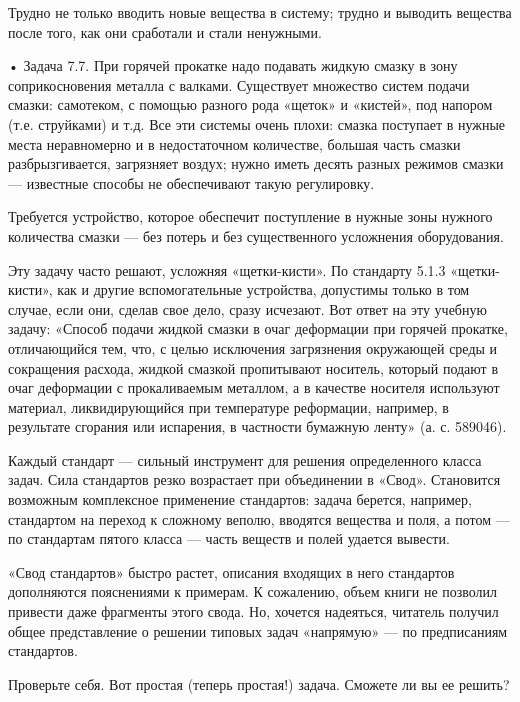 Трудно не только  вводить новые вещества в систему;  трудно и выводить
вещества после того, как они сработали и стали ненужными.

• Задача 7.7. При горячей прокатке  надо подавать жидкую смазку в зону
соприкосновения металла с валками.  Существует множество систем подачи
смазки:  самотеком, с  помощью разного  рода «щеток»  и «кистей»,  под
напором (т.е.  струйками) и т.д.  Все эти системы очень  плохи: смазка
поступает в  нужные места  неравномерно и в  недостаточном количестве,
большая часть  смазки разбрызгивается, загрязняет воздух;  нужно иметь
десять разных режимов смазки — известные способы не обеспечивают такую
регулировку.

Требуется  устройство, которое  обеспечит  поступление  в нужные  зоны
нужного количества смазки — без  потерь и без существенного усложнения
оборудования.

Эту задачу  часто решают,  усложняя «щетки-кисти». По  стандарту 5.1.3
«щетки-кисти»,  как  и  другие вспомогательные  устройства,  допустимы
только в том  случае, если они, сделав свое дело,  сразу исчезают. Вот
ответ  на эту  учебную задачу:  «Способ  подачи жидкой  смазки в  очаг
деформации  при  горячей  прокатке,  отличающийся тем,  что,  с  целью
исключения загрязнения  окружающей среды и сокращения  расхода, жидкой
смазкой  пропитывают  носитель, который  подают  в  очаг деформации  с
прокаливаемым  металлом, а  в качестве  носителя используют  материал,
ликвидирующийся  при температуре  реформации,  например, в  результате
сгорания или испарения, в частности бумажную ленту» (а. с. 589046).




Каждый  стандарт  —  сильный   инструмент  для  решения  определенного
класса  задач.  Сила стандартов  резко  возрастает  при объединении  в
«Свод». Становится возможным комплексное применение стандартов: задача
берется, например,  стандартом на переход к  сложному веполю, вводятся
вещества и поля, а потом — по стандартам пятого класса — часть веществ
и полей удается вывести.




«Свод стандартов»  быстро растет, описания входящих  в него стандартов
дополняются  пояснениями  к  примерам.  К сожалению,  объем  книги  не
позволил привести  даже фрагменты этого свода.  Но, хочется надеяться,
читатель  получил   общее  представление   о  решении   типовых  задач
«напрямую» — по предписаниям стандартов.

Проверьте себя. Вот простая (теперь простая!) задача. Сможете ли вы ее
решить?


